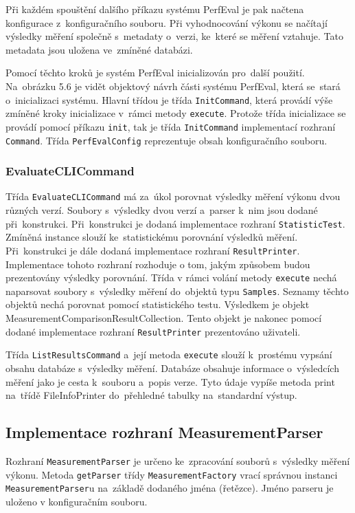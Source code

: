 Při každém spouštění dalšího příkazu systému PerfEval je pak načtena konfigurace z~konfiguračního souboru.
Při vyhodnocování výkonu se načítají výsledky měření společně s~metadaty o~verzi, ke~které se měření vztahuje.
Tato metadata jsou uložena ve~zmíněné databázi.

Pomocí těchto kroků je systém PerfEval inicializován pro~další použití.
Na~obrázku 5.6 je vidět objektový návrh části systému PerfEval, která se~stará o~inicializaci systému.
Hlavní třídou je třída \lstinline|InitCommand|, která provádí výše zmíněné kroky inicializace v~rámci metody \lstinline|execute|.
Protože třída inicializace se provádí pomocí příkazu \texttt{init}, tak je třída \lstinline|InitCommand| implementací rozhraní \lstinline|Command|.
Třída \lstinline|PerfEvalConfig| reprezentuje obsah konfiguračního souboru.


\subsubsection{EvaluateCLICommand}
Třída \lstinline{EvaluateCLICommand} má za~úkol porovnat výsledky měření výkonu dvou různých verzí.
Soubory s~výsledky dvou verzí a~parser k~nim jsou dodané při~konstrukci. Při~konstrukci
je dodaná implementace rozhraní \lstinline{StatisticTest}. Zmíněná instance slouží ke~statistickému
porovnání výsledků měření. Při~konstrukci je dále dodaná implementace rozhraní \lstinline{ResultPrinter}.
Implementace tohoto rozhraní rozhoduje o tom, jakým způsobem budou prezentovány výsledky porovnání.
Třída v rámci volání metody \lstinline{execute} nechá naparsovat soubory s~výsledky měření do~objektů typu \lstinline{Samples}.
Seznamy těchto objektů nechá porovnat pomocí statistického testu. Výsledkem je objekt MeasurementComparisonResultCollection.
Tento objekt je nakonec pomocí dodané implementace rozhraní \lstinline{ResultPrinter} prezentováno uživateli.

Třída \lstinline{ListResultsCommand} a~její metoda \lstinline{execute} slouží k~prostému vypsání obsahu databáze s~výsledky měření.
Databáze obsahuje informace o~výsledcích měření jako je cesta k~souboru a~popis verze. Tyto údaje vypíše
metoda print na~třídě FileInfoPrinter do~přehledné tabulky na~standardní výstup.

\subsection{Implementace rozhraní MeasurementParser}

Rozhraní \lstinline{MeasurementParser} je určeno ke~zpracování souborů s~výsledky měření výkonu.
Metoda \lstinline{getParser} třídy \lstinline{MeasurementFactory} vrací správnou instanci \lstinline{MeasurementParser}u na~základě dodaného jména (řetězce).
Jméno parseru je uloženo v konfiguračním souboru.

